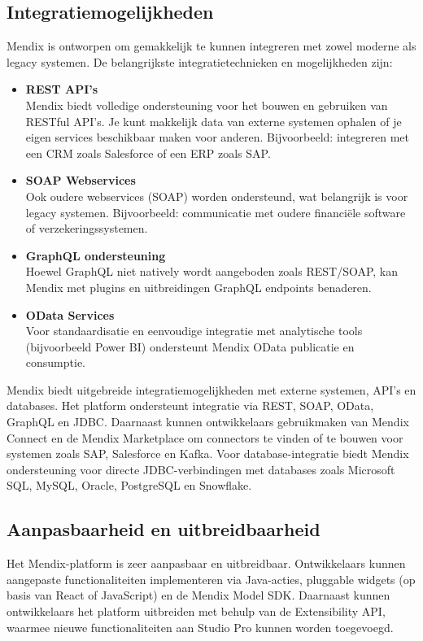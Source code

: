 \subsection{Integratiemogelijkheden}
Mendix is ontworpen om gemakkelijk te kunnen integreren met zowel moderne als legacy systemen. De belangrijkste integratietechnieken en mogelijkheden zijn:
\begin{itemize}
    \item \textbf{REST API's}
    \\
    Mendix biedt volledige ondersteuning voor het bouwen en gebruiken van RESTful API's. Je kunt makkelijk data van externe systemen ophalen of je eigen services beschikbaar maken voor anderen.
    Bijvoorbeeld: integreren met een CRM zoals Salesforce of een ERP zoals SAP.
    \item \textbf{SOAP Webservices}
    \\
    Ook oudere webservices (SOAP) worden ondersteund, wat belangrijk is voor legacy systemen.
    Bijvoorbeeld: communicatie met oudere financiële software of verzekeringssystemen.
    \item \textbf{GraphQL ondersteuning}
    \\
    Hoewel GraphQL niet natively wordt aangeboden zoals REST/SOAP, kan Mendix met plugins en uitbreidingen GraphQL endpoints benaderen.
    \item \textbf{OData Services}
    \\
    Voor standaardisatie en eenvoudige integratie met analytische tools (bijvoorbeeld Power BI) ondersteunt Mendix OData publicatie en consumptie.
\end{itemize}
Mendix biedt uitgebreide integratiemogelijkheden met externe systemen, API’s en databases. Het platform ondersteunt integratie via REST, SOAP, OData, GraphQL en JDBC. Daarnaast kunnen ontwikkelaars gebruikmaken van Mendix Connect en de Mendix Marketplace om connectors te vinden of te bouwen voor systemen zoals SAP, Salesforce en Kafka. Voor database-integratie biedt Mendix ondersteuning voor directe JDBC-verbindingen met databases zoals Microsoft SQL, MySQL, Oracle, PostgreSQL en Snowflake.

\subsection{Aanpasbaarheid en uitbreidbaarheid}
Het Mendix-platform is zeer aanpasbaar en uitbreidbaar. Ontwikkelaars kunnen aangepaste functionaliteiten implementeren via Java-acties, pluggable widgets (op basis van React of JavaScript) en de Mendix Model SDK. Daarnaast kunnen ontwikkelaars het platform uitbreiden met behulp van de Extensibility API, waarmee nieuwe functionaliteiten aan Studio Pro kunnen worden toegevoegd.


